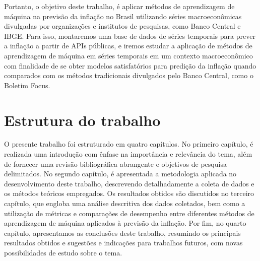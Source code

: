 Portanto, o objetivo deste trabalho, é aplicar métodos de aprendizagem de máquina na previsão da inflação no Brasil utilizando séries macroeconômicas divulgadas por organizações e institutos de pesquisas, como Banco Central e IBGE. Para isso, montaremos uma base de dados de séries temporais para prever a inflação a partir de APIs públicas, e iremos estudar a aplicação de métodos de aprendizagem de máquina em séries temporais em um contexto macroeconômico com finalidade de se obter modelos satisfatórios para predição da inflação quando comparados com os métodos tradicionais divulgados pelo Banco Central, como o Boletim Focus.

\section{Estrutura do trabalho}\label{sec-estrutura}

O presente trabalho foi estruturado em quatro capítulos. No primeiro capítulo, é realizada uma introdução com ênfase na importância e relevância do tema, além de fornecer uma revisão bibliográfica abrangente e objetivos de pesquisa delimitados. No segundo capítulo, é apresentada a metodologia aplicada no desenvolvimento deste trabalho, descrevendo detalhadamente a coleta de dados e os métodos teóricos empregados. Os resultados obtidos são discutidos no terceiro capítulo, que engloba uma análise descritiva dos dados coletados, bem como a utilização de métricas e comparações de desempenho entre diferentes métodos de aprendizagem de máquina aplicados à previsão da inflação. Por fim, no quarto capítulo, apresentamos as conclusões deste trabalho, resumindo os principais resultados obtidos e sugestões e indicações para trabalhos futuros, com novas possibilidades de estudo sobre o tema.